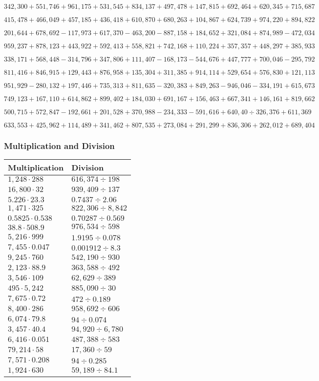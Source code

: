 \(342,300+551,746+961,175+531,545+834,137+497,478+147,815+692,464+620,345+ 715,687\)

\(415,478+466,049+457,185+436,418+610,870+680,263+104,867+624,739+974,220+894,822\)

\(201,644+678,692-117,973+617,370-463,200-887,158+184,652+321,084+874,989-472,034\)

\(959,237+878,123+443,922+592,413+558,821+742,168+110,224+357,357+448,297+385,933\)

\(338,171+568,448-314,796+347,806+111,407-168,173-544,676+447,777+700,046-295,792\)

\(811,416+846,915+129,443+876,958+135,304+311,385+914,114+529,654+576,830+121,113\)

\(951,929-280,132+197,446+735,313+811,635-320,383+849,263-946,046-334,191+615,673\)

\(749,123+167,110+614,862+899,402+184,030+691,167+156,463+667,341+146,161+819,662\)

\(500,715+572,847-192,661+201,528+370,988-234,333-591,616+640,40÷326,376+611,369\)

\(633,553+425,962+114,489+341,462+807,535+273,084+291,299+836,306+262,012+689,404\)

\hypertarget{multiplication-and-division-340}{%
\subsubsection{Multiplication and
Division}\label{multiplication-and-division-340}}

\begin{longtable}[]{@{}ll@{}}
\toprule
Multiplication & Division\tabularnewline
\midrule
\endhead
\(1,248\cdot288\) & \(616,374÷198\)\tabularnewline
\(16,800\cdot32\) & \(939,409÷137\)\tabularnewline
\(5.226\cdot23.3\) & \(0.7437÷2.06\)\tabularnewline
\(1,471\cdot325\) & \(822,306÷8,842\)\tabularnewline
\(0.5825\cdot0.538\) & \(0.70287÷0.569\)\tabularnewline
\(38.8\cdot508.9\) & \(976,534÷598\)\tabularnewline
\(5,216\cdot999\) & \(1.9195÷0.078\)\tabularnewline
\(7,455\cdot0.047\) & \(0.001912÷8.3\)\tabularnewline
\(9,245\cdot760\) & \(542,190÷930\)\tabularnewline
\(2,123\cdot88.9\) & \(363,588÷492\)\tabularnewline
\(3,546\cdot109\) & \(62,629÷389\)\tabularnewline
\(495\cdot5,242\) & \(885,090÷30\)\tabularnewline
\(7,675\cdot0.72\) & \(472÷0.189\)\tabularnewline
\(8,400\cdot286\) & \(958,692÷606\)\tabularnewline
\(6,074\cdot79.8\) & \(94÷0.074\)\tabularnewline
\(3,457\cdot40.4\) & \(94,920÷6,780\)\tabularnewline
\(6,416\cdot0.051\) & \(487,388÷583\)\tabularnewline
\(79,214\cdot58\) & \(17,360÷59\)\tabularnewline
\(7,571\cdot0.208\) & \(94÷0.285\)\tabularnewline
\(1,924\cdot630\) & \(59,189÷84.1\)\tabularnewline
\bottomrule
\end{longtable}

